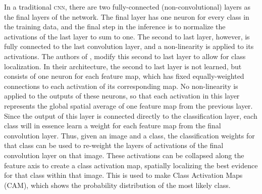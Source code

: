 In a traditional \textsc{cnn}, there are two fully-connected (non-convolutional) layers as the final layers of the network. 
The final layer has one neuron for every class in the training data, and the final step in the inference is to normalize the activations of the last layer to sum to one.
The second to last layer, however, is fully connected to the last convolution layer, and a non-linearity is applied to its activations.
The authors of \cite{oquab2015object}, \cite{zhou2015learning} modify this second to last layer to allow for class localization.
In their architecture, the second to last layer is not learned, but consists of one neuron for each feature map, which has fixed  equally-weighted connections to each activation of its corresponding map.
No non-linearity is applied to the outputs of these neurons, so that each activation in this layer represents the global spatial average of one feature map from the previous layer.
Since the output of this layer is connected directly to the classification layer, each class will in essence learn a weight for each feature map from the final convolution layer.
Thus, given an image and a class, the classification weights for that class can be used to re-weight the layers of activations of the final convolution layer on that image.
These activations can be collapsed along the feature axis to create a class activation map, spatially localizing the best evidence for that class within that image. 
This is used to make Class Activation Maps (CAM), which shows the probability distribution of the most likely class.

